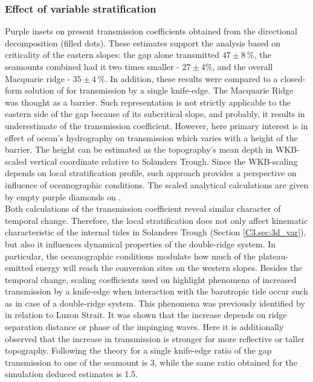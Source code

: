 \documentclass[12pt]{article}
\begin{document}
\subsubsection{Effect of variable stratification}
\label{C3.sec:strat_eff}
Purple insets on  present transmission coefficients obtained from the 
directional decomposition (filled dots). These estimates support the analysis based on 
criticality of the eastern slopes: the gap alone transmitted $47 \pm 8~\%$, the seamounts 
combined had it two times smaller - $27 \pm 4\%$, and the overall Macquarie ridge - $35 \pm 4~\%$. 
In addition, these results were compared to a closed-form solution of 
\cite{larsen1969internal} for transmission by a single knife-edge. The Macquarie Ridge was thought 
as a barrier. Such representation is not strictly applicable to the eastern side of the gap because 
of its subcritical slope, and probably, it results in underestimate of the transmission 
coefficient. However, here primary interest is in effect of ocean's hydrography on transmission 
which  
varies with a height of the barrier. The height can be estimated as the topography's mean depth in 
WKB-scaled vertical coordinate \citep{althaus2003internal} relative to Solanders Trough. Since the 
WKB-scaling depends on local stratification profile, such approach provides a perspective on 
influence of oceanographic conditions. The scaled analytical calculations are given by empty purple 
diamonds on .\\

Both calculations of the transmission coefficient reveal similar character of temporal change. 
Therefore, the local stratification does not only affect kinematic characteristic of the internal 
tides 
in 
Solanders Trough (Section \ref{C3.sec:3d_var}), but also it influences dynamical properties of the 
double-ridge system. In particular, the oceanographic conditions modulate how much of the 
plateau-emitted energy will reach the conversion sites on the western slopes. Besides the temporal 
change, scaling coefficients used on  highlight phenomena of 
increased transmission by a knife-edge when interaction with the barotropic tide occur such as in 
case of a double-ridge system. This 
phenomena was previously identified by \cite{klymak2013parameterizing} in relation to 
Luzon Strait. It was shown that the increase depends on ridge separation distance or phase of the 
impinging waves. Here it is additionally observed that the increase in transmission is stronger for 
more reflective or taller topography. Following the theory for a single knife-edge ratio of the gap 
transmission to one of the seamount is 3, while the same ratio obtained for the simulation deduced 
estimates is 1.5.\\
\end{document}
